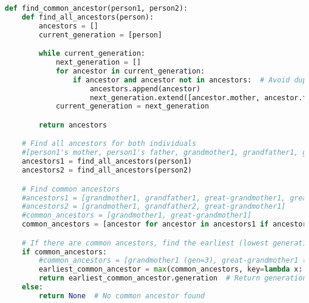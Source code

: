 \begin{lstlisting}[language=Python]


\end{lstlisting}
\begin{lstlisting}[language=Python]
def find_common_ancestor(person1, person2):
    def find_all_ancestors(person):
        ancestors = []
        current_generation = [person]

        while current_generation:
            next_generation = []
            for ancestor in current_generation:
                if ancestor and ancestor not in ancestors:  # Avoid duplicates
                    ancestors.append(ancestor)
                    next_generation.extend([ancestor.mother, ancestor.father])
            current_generation = next_generation

        return ancestors

    # Find all ancestors for both individuals
    #[person1's mother, person1's father, grandmother1, grandfather1, great-grandmother1, great-grandfather1]
    ancestors1 = find_all_ancestors(person1)
    ancestors2 = find_all_ancestors(person2)

    # Find common ancestors
    #ancestors1 = [grandmother1, grandfather1, great-grandmother1, great-grandfather1]
    #ancestors2 = [grandmother1, grandfather2, great-grandmother1]
    #common_ancestors = [grandmother1, great-grandmother1]
    common_ancestors = [ancestor for ancestor in ancestors1 if ancestor in ancestors2]

    # If there are common ancestors, find the earliest (lowest generation number)
    if common_ancestors:
        #common_ancestors = [grandmother1 (gen=3), great-grandmother1 (gen=2)] => answer should be 3
        earliest_common_ancestor = max(common_ancestors, key=lambda x: x.generation)
        return earliest_common_ancestor.generation  # Return generation of the earliest common ancestor
    else:
        return None  # No common ancestor found

\end{lstlisting}
